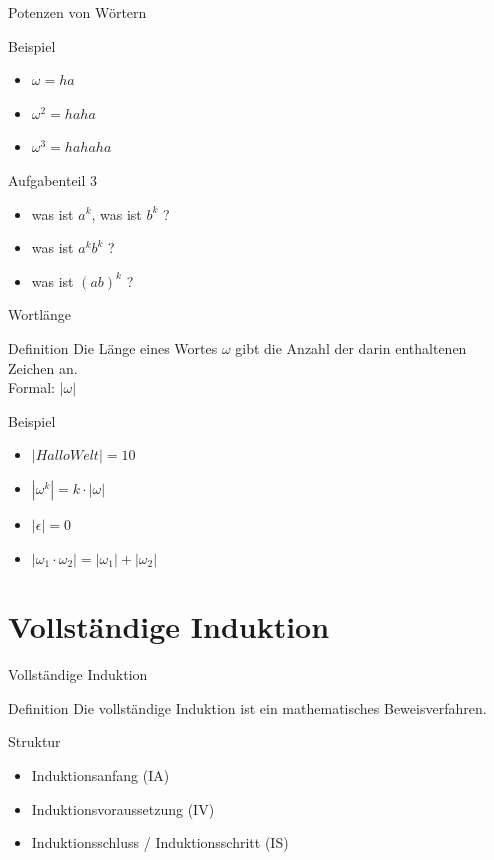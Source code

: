 \documentclass[18pt]{beamer}
\begin{document}
	
	\begin{frame} {Potenzen von W\"ortern}
		\begin{exampleblock} {Beispiel}
			\begin{itemize}
				\item $\omega = ha$
				\item $\omega^2 = haha$
				\item $\omega^3 = hahaha$
			\end{itemize}
		\end{exampleblock}
	\end{frame}
	
	
	\begin{frame} {Aufgabenteil 3}
		\begin{itemize}
			\item was ist $a^k$, was ist $b^k$ ?
			\pause
			\item was ist $a^kb^k$ ?
			\pause
			\item was ist $(ab)^k$ ?
		\end{itemize}
	\end{frame}
	
	
	\begin{frame} {Wortl\"ange}
		\begin{block} {Definition}
			Die L\"ange eines Wortes $\omega$ gibt die Anzahl der darin enthaltenen Zeichen an. \\
			Formal: $|\omega|$
		\end{block}
		
		\begin{exampleblock} {Beispiel}
			\begin{itemize}
				\item $|Hallo Welt| = 10$
				\pause
				\item $|\omega^k| = k \cdot |\omega|$
				\pause
				\item $|\epsilon| = 0$
				\pause
				\item $|\omega_1 \cdot \omega_2| = |\omega_1| + |\omega_2|$
			\end{itemize}
		\end{exampleblock}
	\end{frame}
	
	
	\section{Vollst\"andige Induktion}
	\begin{frame} {Vollst\"andige Induktion}
		\begin{block} {Definition}
			Die vollst\"andige Induktion ist ein mathematisches Beweisverfahren.\\
		\end{block}
		
		\begin{exampleblock} {Struktur}
			\begin{itemize}
				\item Induktionsanfang (IA)
				\item Induktionsvoraussetzung (IV)
				\item Induktionsschluss / Induktionsschritt (IS)
			\end{itemize}
		\end{exampleblock}
	\end{frame}
	
\end{document}
